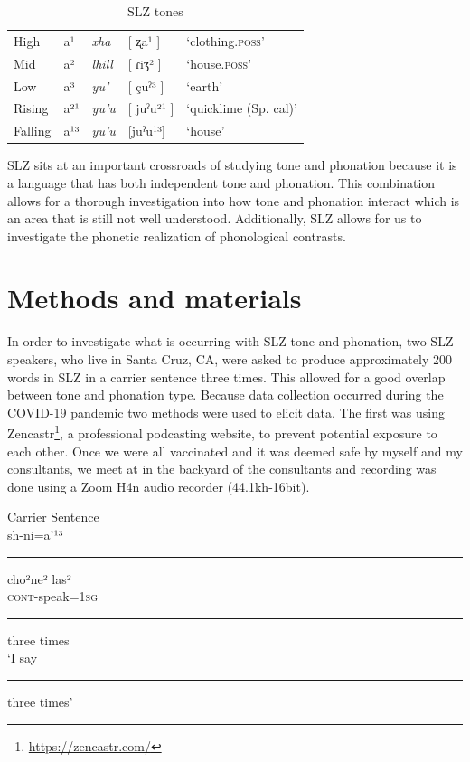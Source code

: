 \documentclass[12pt, letterpaper]{article}
\providecommand{\lsptoprule}{\midrule\toprule}
\providecommand{\lspbottomrule}{\bottomrule\midrule}
\begin{document}
\begin{table}[!h]
\centering
\caption{SLZ tones}
\label{tab:tones}
 \begin{tabular}{lllll}
  \lsptoprule
  High   	&  a¹  &  \textit{xha}   &  [ ʐa¹ ] & `clothing.\textsc{poss}'\\
	Mid    	&  a²  &  \textit{lhill} 	& [ ɾiʒ² ] & `house.\textsc{poss}' \\
	Low   	&  a³  &  \textit{yu'} 	&	 [ çuˀ³ ] & `earth'\\
	Rising	&  a²¹  &  \textit{yu'u} 	&	[ juˀu²¹ ] & `quicklime (Sp. cal)' \\
	Falling &  a¹³  &  \textit{yu'u}  &	[juˀu¹³] &	`house' \\
  \lspbottomrule
 \end{tabular}
\end{table}

SLZ sits at an important crossroads of studying tone and phonation because it is a language that has both independent tone and phonation. This combination allows for a thorough investigation into how tone and phonation interact which is an area that is still not well understood. Additionally, SLZ allows for us to investigate the phonetic realization of phonological contrasts. 

\section{Methods and materials} \label{sec:Methods}

In order to investigate what is occurring with SLZ tone and phonation, two SLZ speakers, who live in Santa Cruz, CA, were asked to produce approximately 200 words in SLZ in a carrier sentence three times. This allowed for a good overlap between tone and phonation type. Because data collection occurred during the COVID-19 pandemic two methods were used to elicit data. The first was using Zencastr\footnote{\href{https://zencastr.com/}{https://zencastr.com/}}, a professional podcasting website, to prevent potential exposure to each other. Once we were all vaccinated and it was deemed safe by myself and my consultants, we meet at in the backyard of the consultants and recording was done using a Zoom H4n audio recorder (44.1kh-16bit).  

\ea Carrier Sentence \label{ex:carrier}\\
\gll sh-ni=a'¹³ \rule{10mm}{1pt} cho²ne² las²\\ 
\textsc{cont}-speak=1\textsc{sg} \rule{10mm}{1pt} three times\\
\trans `I say \rule{10mm}{1pt} three times'	
\z 
\end{document}

